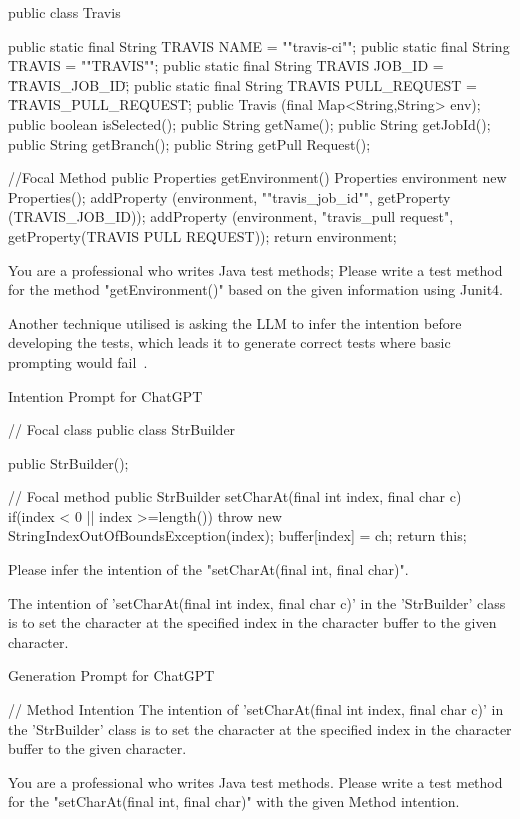 \begin{prompt}
public class Travis {
public static final String TRAVIS NAME = ""travis-ci"";
public static final String TRAVIS = ""TRAVIS"";
public static final String TRAVIS JOB_ID = \"TRAVIS_JOB_ID\";
public static final String TRAVIS PULL_REQUEST = \"TRAVIS_PULL_REQUEST\";
public Travis (final Map<String,String> env);
public boolean isSelected();
public String getName();
public String getJobId();
public String getBranch();
public String getPull Request();

//Focal Method
public Properties getEnvironment() {
  Properties environment new Properties();
  addProperty (environment, ""travis_job_id"", getProperty (TRAVIS_JOB_ID));
  addProperty (environment, "travis_pull request", getProperty(TRAVIS PULL REQUEST));
  return environment;
  }
}

You are a professional who writes Java test methods;
Please write a test method for the method "getEnvironment()" based on the given information using Junit4.
\end{prompt}

Another technique utilised is asking the LLM to infer the intention before developing the tests, which leads it to generate correct tests where basic prompting would fail~\cite{kn:chattester}.

\begin{prompt}
Intention Prompt for ChatGPT

// Focal class
public class StrBuilder {
  public StrBuilder();

  // Focal method
  public StrBuilder setCharAt(final int index, final char c){
    if(index < 0 || index >=length()) {
      throw new StringIndexOutOfBoundsException(index);
    }
    buffer[index] = ch; return this;
  }
}

Please infer the intention of the "setCharAt(final int, final char)".
\end{prompt}

\begin{answer}
The intention of 'setCharAt(final int index, final char c)' in the 'StrBuilder' class is to set the character at the specified index in the character buffer to the given character.
\end{answer}

\begin{prompt}
Generation Prompt for ChatGPT

// Method Intention
The intention of 'setCharAt(final int index, final char c)' in the 'StrBuilder' class is to set the character at the specified index in the character buffer to the given character.

You are a professional who writes Java test methods.
Please write a test method for the "setCharAt(final int, final char)" with the given Method intention.
\end{prompt}

